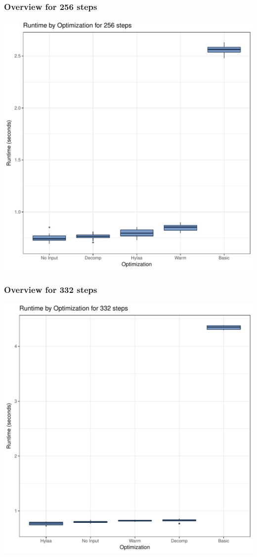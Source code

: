 \documentclass{article}\usepackage[]{graphicx}\usepackage[]{color}
\makeatletter
\def\maxwidth{ %
  \ifdim\Gin@nat@width>\linewidth
    \linewidth
  \else
    \Gin@nat@width
  \fi
}
\newenvironment{knitrout}{}{} %
\makeatother
\begin{document}
\subsubsection{Overview for 256 steps}
\begin{knitrout}
\color{fgcolor}
\includegraphics[width=\maxwidth]{figure/steps256-1} 

\end{knitrout}
\subsubsection{Overview for 332 steps}
\begin{knitrout}
\color{fgcolor}
\includegraphics[width=\maxwidth]{figure/steps332-1} 

\end{knitrout}
\end{document}
